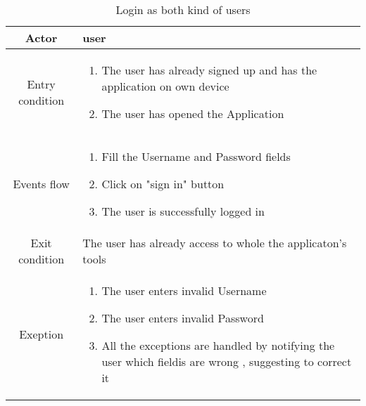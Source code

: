 \documentclass{article}
\begin{document}
		
		\begin{table} [H]
		\begin{center}
		\caption{Login as both kind of users}
		\begin{tabular}{|c|p{8cm}|}
			\hline
			Actor&user\\
			\hline
			Entry condition&
				\begin{enumerate}
					\item The user has already signed up and has the application on own device
					\item The user has opened the Application
				\end{enumerate}\\
			\hline
			Events flow&
			\begin{enumerate}
			\item Fill the Username and Password fields 
			\item Click on "sign in" button
			\item The user is successfully logged in 
			
			\end{enumerate}\\
			\hline
			Exit condition& The user has already access to whole the applicaton's tools\\
			\hline
			Exeption&
			\begin{enumerate}
			\item The user enters invalid Username
			\item The user enters invalid Password
			\item All the exceptions are handled by notifying the user which fieldis are wrong , suggesting to correct it
			
			\end{enumerate}\\
			\hline
		\end{tabular}
				
		\end{center}


		\end{table} 
\end{document}
